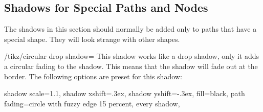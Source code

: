 \subsection{Shadows for Special Paths and Nodes}

The shadows in this section should normally be added only to paths
that have a special shape. They will look strange with other shapes.

\begin{key}{/tikz/circular drop shadow=}
  This shadow works like a drop shadow, only it adds a circular
  fading to the shadow. This means that the shadow will fade out at
  the border. The following options are preset for this shadow:
\begin{codeexample}
  shadow scale=1.1, shadow xshift=.3ex, shadow yshift=-.3ex,
  fill=black, path fading={circle with fuzzy edge 15 percent},
  every shadow,
\end{codeexample}

\begin{codeexample}[]
\end{codeexample}
\end{key}


